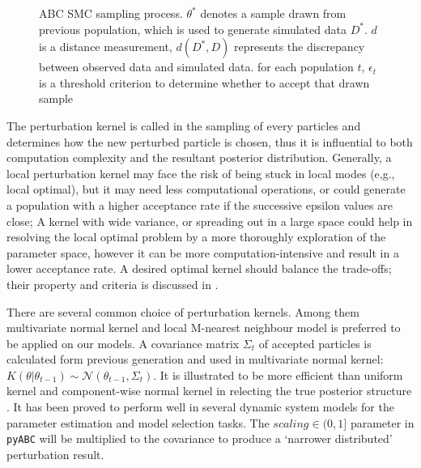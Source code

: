 \documentclass[12pt,a4paper]{report}
\begin{document}
\begin{figure}[t!]
    \begin{center}
    \end{center}
    
    \caption[ABC SMC sampling process]%
    {ABC SMC sampling process. $\theta^*$ denotes a sample drawn from previous population, which is used to generate simulated data $D^*$. $d$ is a distance measurement, $d(D^*,D)$ represents the discrepancy between observed data and simulated data. for each population $t$, $\epsilon_t$ is a threshold criterion to determine whether to accept that drawn sample} 
    \label{fig:smc}
    
\end{figure}

The perturbation kernel is called in the sampling of every particles and determines how the new perturbed particle is chosen, thus it is influential to both computation complexity and the resultant posterior distribution. Generally, a local perturbation kernel may face the risk of being stuck in local modes (e,g., local optimal), but it may need less computational operations, or could generate a population with a higher acceptance rate if the successive epsilon values are close; A kernel with wide variance, or spreading out in a large space could help in resolving the local optimal problem by a more thoroughly exploration of the parameter space, however it can be more computation-intensive and result in a lower acceptance rate. A desired optimal kernel should balance the trade-offs; their property and criteria is discussed in \cite{ref:kernel}.

There are several common choice of perturbation kernels. Among them multivariate normal kernel and local M-nearest neighbour model is preferred to be applied on our models. A covariance matrix $\Sigma_t$ of accepted particles is calculated form previous generation and used in multivariate normal kernel: $K(\theta|\theta_{t-1})\sim\mathcal{N}(\theta_{t-1}, \Sigma_t)$. It is illustrated to be more efficient than uniform kernel and component-wise normal kernel in relecting the true posterior structure \cite{ref:kernel}. It has been proved to perform well in several dynamic system models \cite{ref:abcsysbio, ref:compare, ref:disease} for the parameter estimation and model selection tasks. The $scaling\in(0,1]$ parameter in \verb|pyABC| will be multiplied to the covariance to produce a `narrower distributed' perturbation result.
\end{document}
